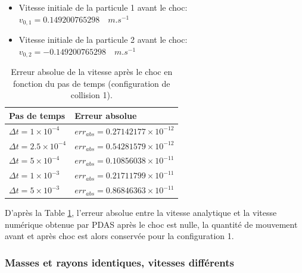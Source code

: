 \begin{itemize}
    \item Vitesse initiale de la particule 1 avant le choc:\\
    $v_{0,1} = 0.149200765298 \quad m.s^{-1} $ 
    \item Vitesse initiale de la particule 2 avant le choc:\\
    $v_{0,2} = -0.149200765298 \quad m.s^{-1} $
\end{itemize}

\begin{center}
\begin{table}[!h]
\begin{tabular}{ |p{5.75cm}|p{6.8cm}| }

 \hline \rowcolor{lightgray}
 Pas de temps & Erreur absolue\\
 \hline
 $\Delta t = 1\times10^{-4}$ & $err_{abs} = 0.27142177\times10^{-12}$\\
 $\Delta t = 2.5\times10^{-4}$ & $err_{abs} = 0.54281579\times10^{-12}$\\
 $\Delta t = 5\times10^{-4}$ & $err_{abs} = 0.10856038\times10^{-11}$\\
 $\Delta t = 1\times10^{-3}$ & $err_{abs} = 0.21711799\times10^{-11}$\\
 $\Delta t = 5\times10^{-3}$ & $err_{abs} = 0.86846363\times10^{-11}$\\
 \hline
\end{tabular}
\caption{Erreur absolue de la vitesse après le choc en fonction du pas de temps (configuration de collision 1).}\label{tab2}
\end{table}
\end{center}

D'après la Table \ref{tab2}, l'erreur absolue entre la vitesse analytique et la vitesse numérique obtenue par PDAS après le choc est nulle, la quantité de mouvement avant et après choc est alors conservée pour la configuration 1. 

\subsubsection{Masses et rayons identiques, vitesses différents}

